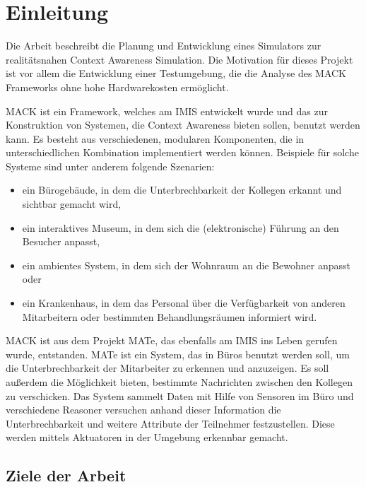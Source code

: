 \chapter{Einleitung}\label{chapter:introduction}


Die Arbeit beschreibt die Planung und Entwicklung eines Simulators zur realitätsnahen Context Awareness Simulation. Die Motivation für dieses Projekt ist vor allem die Entwicklung einer Testumgebung, die die Analyse des MACK Frameworks ohne hohe Hardwarekosten ermöglicht.

MACK ist ein Framework, welches am IMIS entwickelt wurde und das zur Konstruktion von Systemen, die Context Awareness bieten sollen, benutzt werden kann. Es besteht aus verschiedenen, modularen Komponenten, die in unterschiedlichen Kombination implementiert werden können. Beispiele für solche Systeme sind unter anderem folgende Szenarien:
\begin{itemize}
\item ein Bürogebäude, in dem die Unterbrechbarkeit der Kollegen erkannt und sichtbar gemacht wird,
\item ein interaktives Museum, in dem sich die (elektronische) Führung an den Besucher anpasst,
\item ein ambientes System, in dem sich der Wohnraum an die Bewohner anpasst oder
\item ein Krankenhaus, in dem das Personal über die Verfügbarkeit von anderen Mitarbeitern oder bestimmten Behandlungsräumen informiert wird.
\end{itemize}
MACK ist aus dem Projekt MATe, das ebenfalls am IMIS ins Leben gerufen wurde, entstanden. MATe ist ein System, das in Büros benutzt werden soll, um die Unterbrechbarkeit der Mitarbeiter zu erkennen und anzuzeigen. Es soll außerdem die Möglichkeit bieten, bestimmte Nachrichten zwischen den Kollegen zu verschicken. Das System sammelt Daten mit Hilfe von Sensoren im Büro und verschiedene Reasoner versuchen anhand dieser Information die Unterbrechbarkeit und weitere Attribute der Teilnehmer festzustellen. Diese werden mittels Aktuatoren in der Umgebung erkennbar gemacht.

\section{Ziele der Arbeit}\label{sec:goals}

